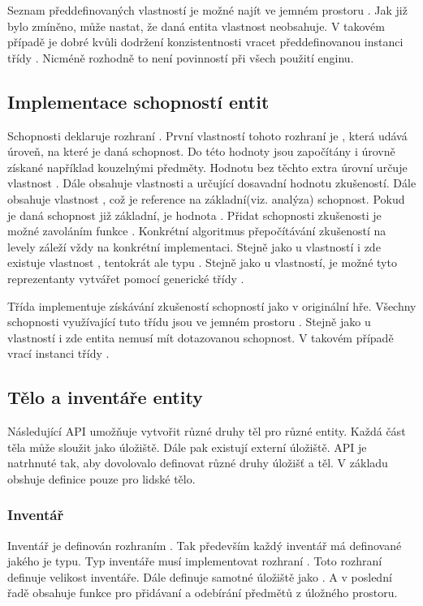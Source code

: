  Seznam předdefinovaných vlastností je možné najít ve jemném prostoru .
 Jak již bylo zmíněno, může nastat, že daná entita vlastnost neobsahuje. V takovém případě je dobré kvůli dodržení konzistentnosti
vracet předdefinovanou instanci  třídy . Nicméně rozhodně to není povinností při všech použití enginu.

\subsection{Implementace schopností entit}
Schopnosti deklaruje rozhraní . První vlastností tohoto rozhraní je , která udává úroveň,
na které je daná schopnost. Do této hodnoty jsou započítány i úrovně získané například kouzelnými předměty. Hodnotu
bez těchto extra úrovní určuje vlastnost . Dále obsahuje vlastnosti  a 
určující dosavadní hodnotu zkušeností. Dále obsahuje vlastnost , což je reference na základní(viz. analýza) schopnost. Pokud
je daná schopnost již základní, je hodnota . Přidat schopnosti zkušenosti je možné zavoláním funkce .
Konkrétní algoritmus přepočítávání zkušeností na levely záleží vždy  na konkrétní implementaci. Stejně jako u vlastností 
i zde existuje vlastnost , tentokrát ale typu . Stejně jako u vlastností, je možné tyto reprezentanty
vytvářet pomocí generické třídy . 

Třída  implementuje získávání zkušeností schopností jako v originální hře. Všechny schopnosti 
využívající tuto třídu jsou ve jemném prostoru . Stejně jako
u vlastností i zde entita nemusí mít dotazovanou schopnost. V takovém případě vrací instanci třídy .

\subsection{Tělo a inventáře entity}
Následující API umožňuje vytvořit různé druhy těl pro různé entity. Každá část těla může sloužit jako úložiště. Dále pak existují externí
úložiště. API je natrhnuté tak, aby dovolovalo definovat různé druhy úložišť a těl. V základu obshuje definice pouze pro lidské tělo.

\subsubsection{Inventář}
Inventář je definován rozhraním . Tak především každý inventář má definované jakého je typu. Typ inventáře musí implementovat
rozhraní . Toto rozhraní definuje velikost inventáře. Dále definuje samotné úložiště jako . A 
v poslední řadě obsahuje funkce pro přidávaní a odebírání předmětů z úložného prostoru.

